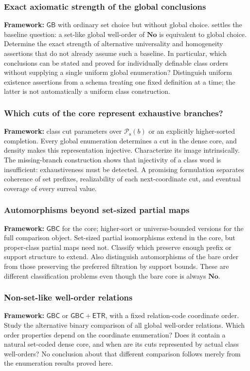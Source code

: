 \documentclass[11pt]{article}
\theoremstyle{definition}
\theoremstyle{remark}
\newcommand{\No}{\mathbf{No}}
\newcommand{\Psupp}{\mathcal P_{\mathrm{s}}}
\newcommand{\GB}{\mathsf{GB}}
\newcommand{\GBC}{\mathsf{GBC}}
\newcommand{\ETR}{\mathsf{ETR}}
\begin{document}
\subsubsection{Exact axiomatic strength of the global conclusions}
\textbf{Framework:} $\GB$ with ordinary set choice but without global
choice.  settles the baseline question: a
set-like global well-order of $\No$ is equivalent to global choice.
Determine the exact strength of alternative universality and homogeneity
assertions that do not already assume such a baseline. In particular,
which conclusions can be stated and proved for individually definable
class orders without supplying a single uniform global enumeration?
Distinguish uniform existence assertions from a schema treating one
fixed definition at a time; the latter is not automatically a uniform
class construction.

\subsubsection{Which cuts of the core represent exhaustive branches?}
\textbf{Framework:} class cut parameters over $\Psupp(b)$ or an explicitly
higher-sorted completion. Every global enumeration determines a cut
in the dense core, and density makes this representation injective.
Characterize its image intrinsically. The missing-branch construction
shows that injectivity of a class word is insufficient: exhaustiveness
must be detected. A promising formulation separates coherence of set
prefixes, realizability of each next-coordinate cut, and eventual
coverage of every surreal value.

\subsubsection{Automorphisms beyond set-sized partial maps}
\textbf{Framework:} $\GBC$ for the core; higher-sort or universe-bounded
versions for the full comparison object. Set-sized partial
isomorphisms extend in the core, but proper-class partial maps need not.
Classify which preserve enough prefix or support structure to extend.
Also distinguish automorphisms of the bare order from those preserving
the preferred filtration by support bounds. These are different
classification problems even though the bare core is always $\No$.

\subsubsection{Non-set-like well-order relations}
\textbf{Framework:} $\GBC$ or $\GBC+\ETR$, with a fixed relation-code
coordinate order. Study the alternative binary comparison of all global
well-order relations. Which order properties depend on the coordinate
enumeration? Does it contain a natural set-coded dense core, and when
are its cuts represented by actual class well-orders? No conclusion
about that different comparison follows merely from the enumeration
results proved here.
\end{document}
